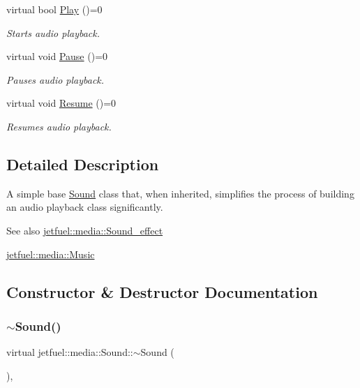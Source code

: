 \begin{DoxyCompactItemize}
virtual bool \hyperlink{classjetfuel_1_1media_1_1Sound_a8861a6671ce039522179d61085f240c8}{Play} ()=0
\begin{DoxyCompactList}\small\item\em Starts audio playback. \end{DoxyCompactList}\item 
virtual void \hyperlink{classjetfuel_1_1media_1_1Sound_adb9cd45e23e6224760051e579aeefa7f}{Pause} ()=0
\begin{DoxyCompactList}\small\item\em Pauses audio playback. \end{DoxyCompactList}\item 
virtual void \hyperlink{classjetfuel_1_1media_1_1Sound_af781fccd8ebb1305e97dc8f6b7c828dc}{Resume} ()=0
\begin{DoxyCompactList}\small\item\em Resumes audio playback. \end{DoxyCompactList}\end{DoxyCompactItemize}


\subsection{Detailed Description}
A simple base \hyperlink{classjetfuel_1_1media_1_1Sound}{Sound} class that, when inherited, simplifies the process of building an audio playback class significantly.

\begin{DoxySeeAlso}{See also}
\hyperlink{classjetfuel_1_1media_1_1Sound__effect}{jetfuel\+::media\+::\+Sound\+\_\+effect} 

\hyperlink{classjetfuel_1_1media_1_1Music}{jetfuel\+::media\+::\+Music} 
\end{DoxySeeAlso}


\subsection{Constructor \& Destructor Documentation}
\mbox{\label{classjetfuel_1_1media_1_1Sound_a9b588c3a8749ce496f19cf499e5d98bb}} 
\subsubsection{\texorpdfstring{$\sim$\+Sound()}{~Sound()}}
{\footnotesize\ttfamily virtual jetfuel\+::media\+::\+Sound\+::$\sim$\+Sound (\begin{DoxyParamCaption}{ }\end{DoxyParamCaption})\hspace{0.3cm}{\ttfamily [inline]}, {\ttfamily [virtual]}}



